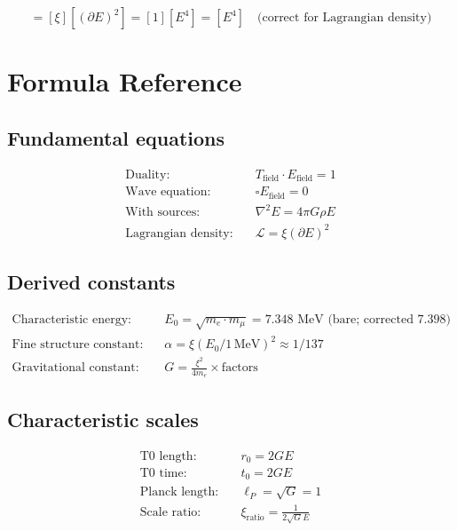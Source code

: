 	\begin{equation}
		[\mathcal{L}] = [\xi][(\partial E)^2] = [1][E^4] = [E^4] \quad \text{(correct for Lagrangian density)}
	\end{equation}
	
	\section{Formula Reference}
	\label{sec:formula_reference}
	
	\subsection{Fundamental equations}
	
	\begin{align}
		\text{Duality:} \quad & T_{\text{field}} \cdot E_{\text{field}} = 1 \\
		\text{Wave equation:} \quad & \square E_{\text{field}} = 0 \\
		\text{With sources:} \quad & \nabla^2 E = 4\pi G \rho E \\
		\text{Lagrangian density:} \quad & \mathcal{L} = \xi (\partial E)^2
	\end{align}
	
	\subsection{Derived constants}
	
	\begin{align}
		\text{Characteristic energy:} \quad & E_0 = \sqrt{m_e \cdot m_\mu} = 7.348 \text{ MeV (bare; corrected } 7.398\text{)} \\
		\text{Fine structure constant:} \quad & \alpha = \xi (E_0/1\,\text{MeV})^2 \approx 1/137 \\
		\text{Gravitational constant:} \quad & G = \frac{\xi^2}{4m_e} \times \text{factors}
	\end{align}
	
	\subsection{Characteristic scales}
	
	\begin{align}
		\text{T0 length:} \quad & r_0 = 2GE \\
		\text{T0 time:} \quad & t_0 = 2GE \\
		\text{Planck length:} \quad & \ell_P = \sqrt{G} = 1 \\
		\text{Scale ratio:} \quad & \xi_{\text{ratio}} = \frac{1}{2\sqrt{G} E}
	\end{align}
	
